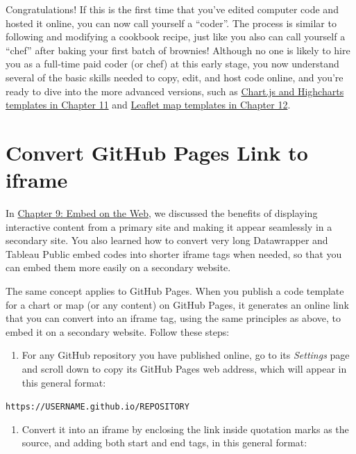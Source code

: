 \documentclass[
  english,
]{book}
\providecommand{\tightlist}{%
  \setlength{\itemsep}{0pt}\setlength{\parskip}{0pt}}
\begin{document}
Congratulations! If this is the first time that you've edited computer code and hosted it online, you can now call yourself a ``coder''. The process is similar to following and modifying a cookbook recipe, just like you also can call yourself a ``chef'' after baking your first batch of brownies! Although no one is likely to hire you as a full-time paid coder (or chef) at this early stage, you now understand several of the basic skills needed to copy, edit, and host code online, and you're ready to dive into the more advanced versions, such as \href{chartcode.html}{Chart.js and Highcharts templates in Chapter 11} and \href{leaflet.html}{Leaflet map templates in Chapter 12}.

\hypertarget{gh-pages-link-to-iframe}{%
\section*{Convert GitHub Pages Link to iframe}\label{gh-pages-link-to-iframe}}

In \href{embed.html}{Chapter 9: Embed on the Web}, we discussed the benefits of displaying interactive content from a primary site and making it appear seamlessly in a secondary site. You also learned how to convert very long Datawrapper and Tableau Public embed codes into shorter iframe tags when needed, so that you can embed them more easily on a secondary website.

The same concept applies to GitHub Pages. When you publish a code template for a chart or map (or any content) on GitHub Pages, it generates an online link that you can convert into an iframe tag, using the same principles as above, to embed it on a secondary website. Follow these steps:

\begin{enumerate}
\def\labelenumi{\arabic{enumi}.}
\tightlist
\item
  For any GitHub repository you have published online, go to its \emph{Settings} page and scroll down to copy its GitHub Pages web address, which will appear in this general format:
\end{enumerate}

\texttt{https://USERNAME.github.io/REPOSITORY}

\begin{enumerate}
\def\labelenumi{\arabic{enumi}.}
\setcounter{enumi}{1}
\tightlist
\item
  Convert it into an iframe by enclosing the link inside quotation marks as the source, and adding both start and end tags, in this general format:
\end{enumerate}
\end{document}
